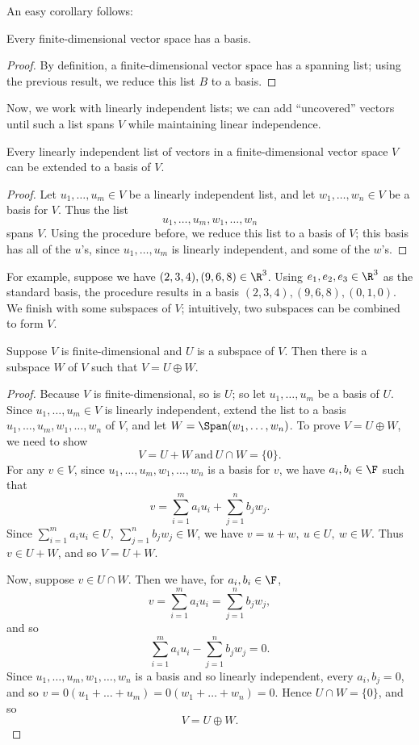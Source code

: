 \documentclass[math0540-lecture-notes.tex]{subfiles}
\begin{document}
An easy corollary follows:
\begin{corollary}{}
  Every finite-dimensional vector space has a basis.
\end{corollary}
\begin{proof}[Proof]
  By definition, a finite-dimensional vector space has a spanning list; using the previous result,
  we reduce this list $B$ to a basis.
\end{proof}

Now, we work with linearly independent lists; we can add ``uncovered'' vectors until such a list
spans $V$ while maintaining linear independence.
\begin{proposition}{}
  Every linearly independent list of vectors in a finite-dimensional vector space $V$ can be
  extended to a basis of $V$.
\end{proposition}
\begin{proof}[Proof]
  Let $u_1,\ldots,u_m\in V$ be a linearly independent list, and let $ w_1,\ldots,w_n\in V$ be a
  basis for $V$. Thus the list \[
    u_1,\ldots,u_m,w_1,\ldots,w_n
  \] spans $V$. Using the procedure before, we reduce this list to a basis of $V$; this basis has
  all of the $u$'s, since $u_1,\ldots,u_m$ is linearly independent, and some of the $w$'s.
\end{proof}

For example, suppose we have $(2,3,4),(9,6,8)\in \R^3$. Using $e_1,e_2,e_3\in \R^3$ as the standard
basis, the procedure results in a basis $(2,3,4),(9,6,8),(0,1,0)$.\\

We finish with some subspaces of $V$; intuitively, two subspaces can be combined to form $V$.
\begin{proposition}{}
  Suppose $V$ is finite-dimensional and $U$ is a subspace of $V$. Then there is a subspace $W$ of
  $V$ such that $V=U\oplus W$.
\end{proposition}
\begin{proof}[Proof]
  Because $V$ is finite-dimensional, so is $U$; so let $ u_1,\ldots,u_m$ be a basis of $U$. Since
  $u_1,\ldots,u_m\in V$ is linearly independent, extend the list to a basis
  $u_1,\ldots,u_m,w_1,\ldots,w_n$ of $V$, and let $W=\Span(w_1,\ldots,w_n)$. To prove $V=U\oplus W$,
  we need to show \[
    V = U+W ~\text{and}~ U\cap W=\{ 0 \}
  .\] 
  For any $v\in V$, since $  u_1,\ldots,u_m,w_1,\ldots,w_n$ is a basis for $v$, we have $a_i,b_i\in
  \F$ such that \[
    v = \sum_{i=1}^{m} a_iu_i + \sum_{j=1}^{n} b_jw_j
  .\] Since $\sum_{i=1}^{m} a_iu_i\in U,\ \sum_{j=1}^{n} b_jw_j\in W$, we have $v=u+w,\ u\in U,\
  w\in W$. Thus $v\in U+W$, and so $V=U+W$.

  Now, suppose $v\in U\cap W$. Then we have, for $a_i,b_i\in \F$, \[
    v = \sum_{i=1}^{m} a_iu_i = \sum_{j=1}^{n} b_jw_j
  ,\] and so \[
    \sum_{i=1}^{m} a_iu_i - \sum_{j=1}^{n} b_jw_j=0
  .\] Since $ u_1,\ldots,u_m,w_1,\ldots,w_n$ is a basis and so linearly independent, every
  $a_i,b_j=0$, and so  $v=0(u_1+\ldots+u_m)=0(w_1+\ldots+w_n)=0$. Hence $U\cap W=\{ 0 \}$, and so \[
    V = U\oplus W
  .\]
\end{proof}
\end{document}
